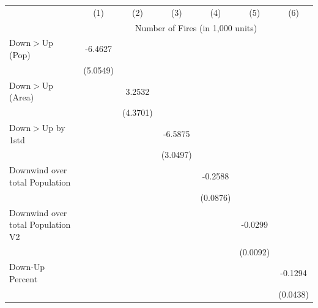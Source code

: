 \begin{tabular}{lcccccc}
\hline
& (1) & (2) & (3) & (4) & (5) & (6)\\
& \multicolumn{6}{c}{Number of Fires (in 1,000 units) }\\
\hline

Down$>$Up (Pop)&     -6.4627         &                     &                     &                     &                     &                     \\
            &    (5.0549)         &                     &                     &                     &                     &                     \\
Down$>$Up (Area)&                     &      3.2532         &                     &                     &                     &                     \\
            &                     &    (4.3701)         &                     &                     &                     &                     \\
Down$>$Up by 1std&                     &                     &     -6.5875\sym{**} &                     &                     &                     \\
            &                     &                     &    (3.0497)         &                     &                     &                     \\
Downwind over total Population&                     &                     &                     &     -0.2588\sym{***}&                     &                     \\
            &                     &                     &                     &    (0.0876)         &                     &                     \\
Downwind over total Population V2&                     &                     &                     &                     &     -0.0299\sym{***}&                     \\
            &                     &                     &                     &                     &    (0.0092)         &                     \\
Down-Up Percent&                     &                     &                     &                     &                     &     -0.1294\sym{***}\\
            &                     &                     &                     &                     &                     &    (0.0438)         \\
\hline

\end{tabular}
